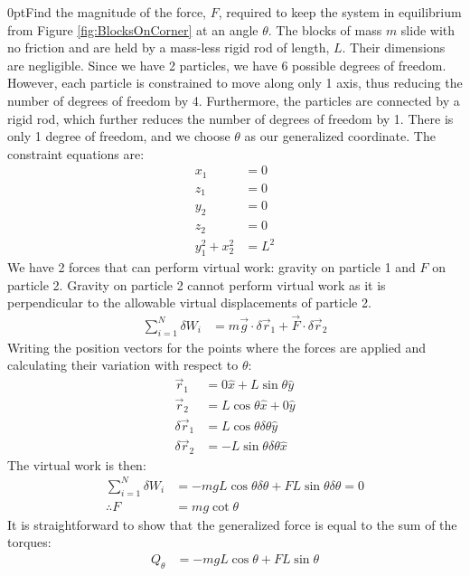 \begin{example}{0pt}{Find the magnitude of the force, $F$, required to keep the system in equilibrium from Figure \ref{fig:BlocksOnCorner} at an angle $\theta$. The blocks of mass $m$ slide with no friction and are held by a mass-less rigid rod of length, $L$. Their dimensions are negligible.}{}
Since we have 2 particles, we have 6 possible degrees of freedom. However, each particle is constrained to move along only 1 axis, thus reducing the number of degrees of freedom by 4. Furthermore, the particles are connected by a rigid rod, which further reduces the number of degrees of freedom by 1. There is only 1 degree of freedom, and we choose $\theta$ as our generalized coordinate. The constraint equations are:
\begin{align*}
x_1&=0\nonumber\\
z_1&=0\nonumber\\
y_2&=0\nonumber\\
z_2&=0\nonumber\\
y_1^2+x_2^2&=L^2
\end{align*}
We have 2 forces that can perform virtual work: gravity on particle 1 and $F$ on particle 2. Gravity on particle 2 cannot perform virtual work as it is perpendicular to the allowable virtual displacements of particle 2.
\begin{align*}
\sum_{i=1}^N\delta W_i &= m\vec{g}\cdot\delta\vec{r}_1+\vec{F}\cdot\delta\vec{r}_2
\end{align*}
Writing the position vectors for the points where the forces are applied and calculating their variation with respect to $\theta$:
\begin{align*}
\vec{r}_1&=0\hat{x}+L\sin{\theta}\hat{y}\\
\vec{r}_2&=L\cos{\theta}\hat{x}+0\hat{y}\\
\delta\vec{r}_1&=L\cos{\theta}\delta\theta\hat{y}\\
\delta\vec{r}_2&=-L\sin{\theta}\delta\theta\hat{x}
\end{align*}
The virtual work is then:
\begin{align*}
\sum_{i=1}^N\delta W_i &= -mgL\cos{\theta}\delta \theta + FL\sin{\theta}\delta \theta=0 \\
\therefore F&=mg\cot{\theta}
\end{align*}
It is straightforward to show that the generalized force is equal to the sum of the torques:
\begin{align*}
Q_\theta &= -mgL\cos{\theta}+FL\sin{\theta}
\end{align*}
\end{example}

